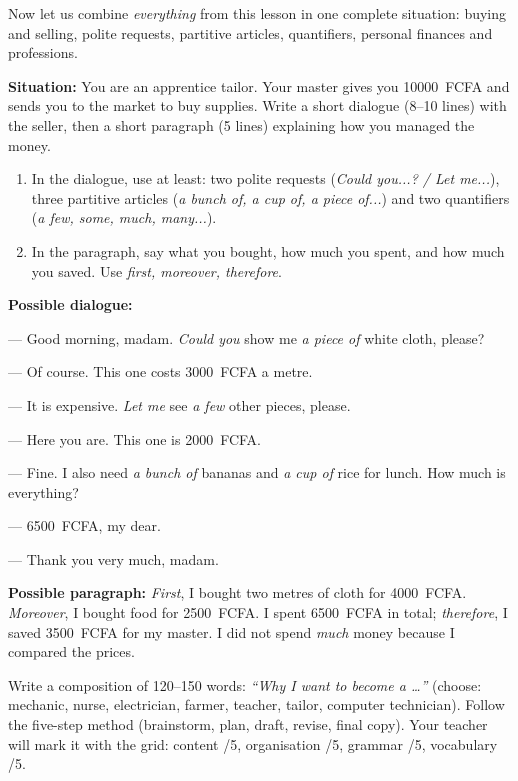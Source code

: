 \documentclass[11pt]{article}
\begin{document}
Now let us combine \emph{everything} from this lesson in one complete situation: buying and selling, polite requests, partitive articles, quantifiers, personal finances and professions.

\begin{exercice}
\textbf{Situation:} You are an apprentice tailor. Your master gives you \SI{10000}{FCFA} and sends you to the market to buy supplies. Write a short dialogue (8--10 lines) with the seller, then a short paragraph (5 lines) explaining how you managed the money.
\begin{enumerate}
\item In the dialogue, use at least: two polite requests (\emph{Could you...? / Let me...}), three partitive articles (\emph{a bunch of, a cup of, a piece of...}) and two quantifiers (\emph{a few, some, much, many...}).
\item In the paragraph, say what you bought, how much you spent, and how much you saved. Use \emph{first, moreover, therefore}.
\end{enumerate}
\end{exercice}

\begin{corrige}
\textbf{Possible dialogue:}\par
--- Good morning, madam. \emph{Could you} show me \emph{a piece of} white cloth, please?\par
--- Of course. This one costs \SI{3000}{FCFA} a metre.\par
--- It is expensive. \emph{Let me} see \emph{a few} other pieces, please.\par
--- Here you are. This one is \SI{2000}{FCFA}.\par
--- Fine. I also need \emph{a bunch of} bananas and \emph{a cup of} rice for lunch. How much is everything?\par
--- \SI{6500}{FCFA}, my dear.\par
--- Thank you very much, madam.\par
\textbf{Possible paragraph:} \emph{First}, I bought two metres of cloth for \SI{4000}{FCFA}. \emph{Moreover}, I bought food for \SI{2500}{FCFA}. I spent \SI{6500}{FCFA} in total; \emph{therefore}, I saved \SI{3500}{FCFA} for my master. I did not spend \emph{much} money because I compared the prices.
\end{corrige}

\begin{exercice}
Write a composition of 120--150 words: \emph{``Why I want to become a \ldots''} (choose: mechanic, nurse, electrician, farmer, teacher, tailor, computer technician). Follow the five-step method (brainstorm, plan, draft, revise, final copy). Your teacher will mark it with the grid: content /5, organisation /5, grammar /5, vocabulary /5.
\end{exercice}
\end{document}
